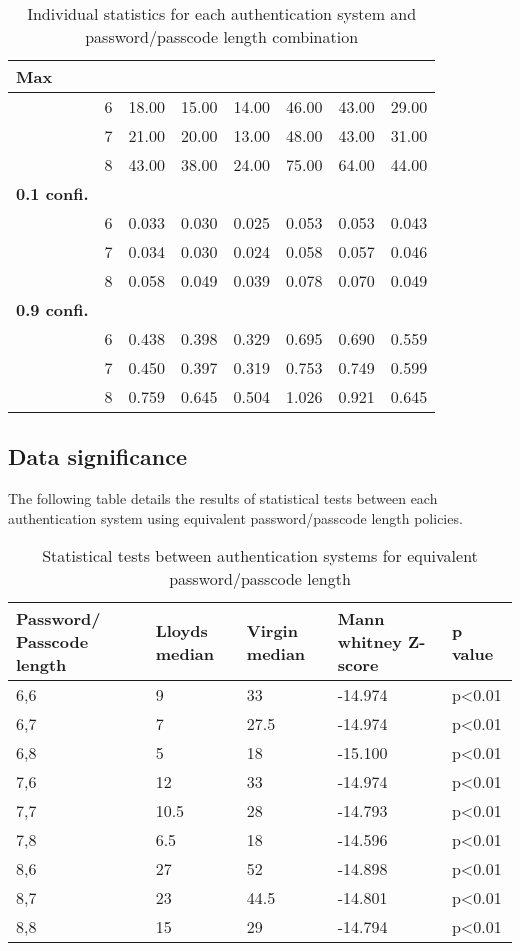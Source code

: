\documentclass[british,11pt,a4paper]{article}
\begin{document}
\begin{appendices}
\begin{table}[!htb]
\begin{tabular}{|l|l|l|l|l|l|l|l|}
		\textbf{Max} &  &  &  &  &  &  &  \\ \hline
		 & 6 & 18.00 & 15.00 & 14.00 & 46.00 & 43.00 & 29.00 \\ \hline
		 & 7 & 21.00 & 20.00 & 13.00 & 48.00 & 43.00 & 31.00 \\ \hline
		 & 8 & 43.00 & 38.00 & 24.00 & 75.00 & 64.00 & 44.00 \\ \hline
		\textbf{0.1 confi.} &  &  &  &  &  &  &  \\ \hline
		 & 6 & 0.033 & 0.030 & 0.025 & 0.053 & 0.053 & 0.043 \\ \hline
		 & 7 & 0.034 & 0.030 & 0.024 & 0.058 & 0.057 & 0.046 \\ \hline
		 & 8 & 0.058 & 0.049 & 0.039 & 0.078 & 0.070 & 0.049 \\ \hline
		\textbf{0.9 confi.} &  &  &  &  &  &  &  \\ \hline
		 & 6 & 0.438 & 0.398 & 0.329 & 0.695 & 0.690 & 0.559 \\ \hline
		 & 7 & 0.450 & 0.397 & 0.319 & 0.753 & 0.749 & 0.599 \\ \hline
		 & 8 & 0.759 & 0.645 & 0.504 & 1.026 & 0.921 & 0.645 \\ \hline
		\end{tabular}
		\caption{Individual statistics for each authentication system and password/passcode length combination}
	\end{table}
	\clearpage

  	\subsection{Data significance}
  	\label{app:significant_stats}
  	The following table details the results of statistical tests between each authentication system using equivalent password/passcode length policies.
  	\begin{table}[!htb]
	\centering
	\begin{tabular}{|p{2cm}|l|l|l|l|}
	\hline
	\textbf{Password/ Passcode length} & \textbf{Lloyds median} & \textbf{Virgin median} & \textbf{Mann whitney Z-score} & \textbf{p value} \\ \hline
	6,6 & 9 & 33 & -14.974 & p\textless0.01 \\ \hline
	6,7 & 7 & 27.5 & -14.974 & p\textless0.01 \\ \hline
	6,8 & 5 & 18 & -15.100 & p\textless0.01 \\ \hline
	7,6 & 12 & 33 & -14.974 & p\textless0.01 \\ \hline
	7,7 & 10.5 & 28 & -14.793 & p\textless0.01 \\ \hline
	7,8 & 6.5 & 18 & -14.596 & p\textless0.01 \\ \hline
	8,6 & 27 & 52 & -14.898 & p\textless0.01 \\ \hline
	8,7 & 23 & 44.5 & -14.801 & p\textless0.01 \\ \hline
	8,8 & 15 & 29 & -14.794 & p\textless0.01 \\ \hline
	\end{tabular}
	\caption{Statistical tests between authentication systems for equivalent password/passcode length}
	\label{tab:significance}
	\end{table}
	\clearpage

\end{appendices}
\end{document}
